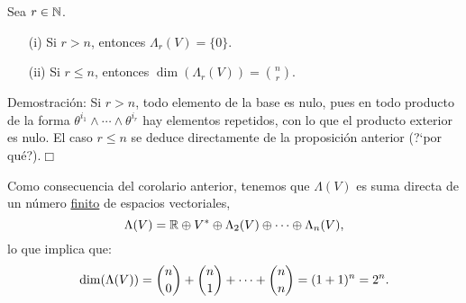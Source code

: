 \documentclass[cursovd_portada.tex]{subfiles}
\begin{document}
\newpage

\begin{coroap}
Sea $r\in\mathbb{N}$.
\begin{enumerate}
\item[(i)] Si $r>n$, entonces $\Lambda_r(V)=\{0\}$.
\item[(ii)] Si $r\leq n$, entonces $\dim (\Lambda_r(V))={n\choose r}$.
\end{enumerate}
\end{coroap}
{\sc Demostración:} Si $r>n$, todo elemento de la base es nulo, pues en todo producto de la forma
$\theta^{i_1}\wedge\cdots\wedge\theta^{i_r}$ hay elementos repetidos, con lo que el producto exterior es nulo. El
caso $r\leq n$ se deduce directamente de la proposición anterior (?`por qué?).\hfill$\Box$
\par
Como consecuencia del corolario anterior, tenemos que $\Lambda (V)$ es suma directa de un número
\underline{finito} de espacios vectoriales,
$$\Lambda(V)=\mathbb{R}\oplus V^*\oplus\Lambda_2(V)\oplus\cdots\oplus\Lambda_n(V),$$
lo que implica que:
$${\rm \dim}(\Lambda(V))={n\choose 0}+{n\choose 1}+\cdots+{n\choose n}=(1+1)^n
=2^n.$$
\end{document}
